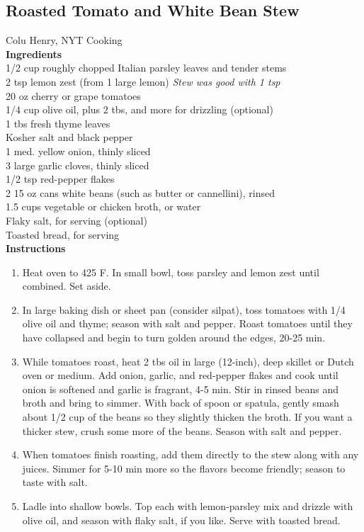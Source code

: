 \documentclass{article}
\numberwithin{figure}{section}
\numberwithin{equation}{section}
\begin{document}
\pagebreak
\subsection{Roasted Tomato and White Bean Stew}
Colu Henry, NYT Cooking\\

{\bf Ingredients}\\
1/2 cup roughly chopped Italian parsley leaves and tender stems\\
2 tsp lemon zest (from 1 large lemon) {\it Stew was good with 1 tsp}\\
20 oz cherry or grape tomatoes\\
1/4 cup olive oil, plus 2 tbs, and more for drizzling (optional)\\
1 tbs fresh thyme leaves\\
Kosher salt and black pepper\\
1 med. yellow onion, thinly sliced\\
3 large garlic cloves, thinly sliced\\
1/2 tsp red-pepper flakes\\
2 15 oz cans white beans (such as butter or cannellini), rinsed\\
1.5 cups vegetable or chicken broth, or water\\
Flaky salt, for serving (optional)\\
Toasted bread, for serving\\

{\bf Instructions}\\
\begin{enumerate}
\item Heat oven to 425 F. In small bowl, toss parsley and lemon zest until combined. Set aside.
\item In large baking dish or sheet pan (consider silpat), toss tomatoes with 1/4 olive oil and thyme; season with salt and pepper. Roast tomatoes until they have collapsed and begin to turn golden around the edges, 20-25 min.
\item While tomatoes roast, heat 2 tbs oil in large (12-inch), deep skillet or Dutch oven or medium. Add onion, garlic, and red-pepper flakes and cook until onion is softened and garlic is fragrant, 4-5 min. Stir in rinsed beans and broth and bring to simmer. With back of spoon or spatula, gently smash about 1/2 cup of the beans so they slightly thicken the broth. If you want a thicker stew, crush some more of the beans. Season with salt and pepper.
\item When tomatoes finish roasting, add them directly to the stew along with any juices. Simmer for 5-10 min more so the flavors become friendly; season to taste with salt.
\item Ladle into shallow bowls. Top each with lemon-parsley mix and drizzle with olive oil, and season with flaky salt, if you like. Serve with toasted bread.
\end{enumerate}
\end{document}
